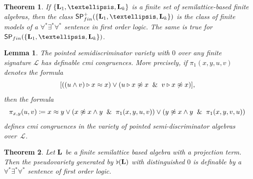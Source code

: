 \documentclass[10pt,a4paper]{amsart}
\newtheorem{thm}{Theorem}
\newtheorem{lem}{Lemma}
\newcommand{\tr}{\triangleright}
\begin{document}
\begin{thm}\label{thm:FOq}
If $\{{\bf L}_1,\dots,{\bf L}_k\}$ is a finite set of semilattice-based finite algebras, then the class $\mathsf{SP}_{\rm fin}^+(\{{\bf L}_1,\dots,{\bf L}_k\})$ is the class of finite models of a $\forall^*\exists^*\forall^*$ sentence in first order logic.  The same is true for $\mathsf{SP}_{\rm fin}(\{{\bf L}_1,\dots,{\bf L}_k\})$.
\end{thm}

\begin{lem}\label{lem:si}
The pointed semidiscriminator variety with $0$ over any finite signature $\mathscr{L}$ has definable cmi congruences.  More precisely, if $\pi_1(x,y,u,v)$ denotes the formula
\[
[((u\wedge v)\tr x\approx x) \vee (u\tr x\not\approx x\And v\tr x\not\approx x)],
\]
then the formula 
\[
\pi_{x,y}(u,v)\coloneqq x\approx y\vee (x\not\approx x\wedge y\And\pi_1(x,y,u,v))\vee(y\not\approx x\wedge y\And\pi_1(x,y,v,u))
\]
defines cmi congruences in the variety of pointed semi-discriminator algebras over~$\mathscr{L}$.
\end{lem}

\begin{thm}\label{thm:FO}
Let ${\bf L}$ be a finite semilattice based algebra with a projection term.  Then the pseudovariety generated by $\flat({\bf L})$ with distinguished $0$ is definable by a $\forall^*\exists^*\forall^*$ sentence of first order logic.
\end{thm}
\end{document}
